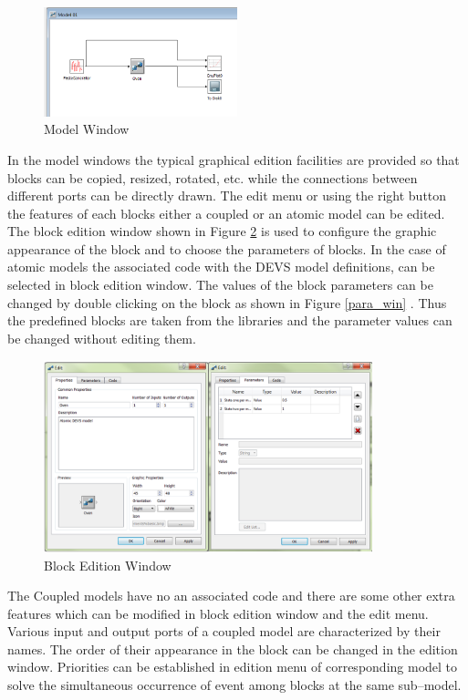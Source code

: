 \documentclass[titlepage]{article}%
\begin{document}
{ \begin{figure}[ht!]
  \centering
    \includegraphics[width=0.5\textwidth]{Fig3.png}
    \caption{Model Window}
    \label{model_win}
\end{figure}

In the model windows the typical graphical edition facilities are provided so that blocks can be copied, resized, rotated, etc. while the connections between different ports can be directly drawn. The edit menu or using the right button the features of each blocks either a coupled or an atomic model can be edited. The block edition window shown in Figure \ref{Block_win} is used to configure the graphic appearance of the block and to choose the parameters of blocks. In the case of atomic models the associated code with the DEVS model definitions, can be selected in block edition window. The values of the block parameters can be changed by double clicking on the block as shown in Figure \ref{para_win} . Thus the predefined blocks are taken from the libraries and the parameter values can be changed without editing them.

\begin{figure}[ht!]
  \centering
    \includegraphics[width=0.85\textwidth]{Fig4.png}
    \caption{Block Edition Window}
    \label{Block_win}
\end{figure}

The Coupled models have no an associated code and there are some other extra features which can be modified in block edition window and the edit menu. Various input and output ports of a coupled model are characterized by their names. The order of their appearance in the block can be changed in the edition window. Priorities can be established in edition menu of corresponding model to solve the simultaneous occurrence of event among blocks at the same sub–model.

}
\end{document}
